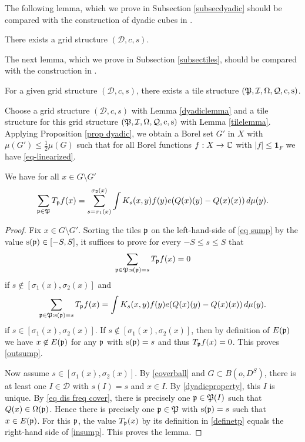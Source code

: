 The following lemma, which we prove in Subsection \ref{subsecdyadic}
should be compared with the construction of dyadic cubes in \cite[\S 3]{christ1990b}.

\begin{lemma}\label{dyadiclemma}
    There exists a grid structure $(\mathcal{D}, c,s)$.
\end{lemma}




The next lemma, which we prove in Subsection \ref{subsectiles}, should be compared
with the construction in \cite[Lemma 2.12]{zk-polynomial}.

\begin{lemma}\label{tilelemma}
    For a given grid structure $(\mathcal{D}, c,s)$, there exists a tile structure
    $(\mathfrak P,\mathcal{I},\Omega,\mathcal{Q},\mathrm{c},\mathrm{s})$.
\end{lemma}

Choose a grid structure $(\mathcal{D}, c,s)$ with Lemma \ref{dyadiclemma} and a tile structure for this
grid structure $(\mathfrak P,\mathcal{I},\Omega,\mathcal{Q},\mathrm{c},\mathrm{s})$ with Lemma \ref{tilelemma}.
Applying Proposition \ref{prop dyadic}, we obtain a Borel set $G'$ in $X$ with $\mu(G')\leq \frac 12 \mu(G)$ such that for all Borel functions $f:X\to \mathbb{C}$ with $|f|\le \mathbf{1}_F$
we have \eqref{eq-linearized}.

\begin{lemma} \label{lemmasump}
We have for all $x\in G\setminus G'$
\begin{equation}\label{eq sump}
    \sum_{\mathfrak p\in \mathfrak P}T_{\mathfrak p} f(x)= \sum_{s=\sigma_1(x)}^{\sigma_2(x)}
    \int   K_{s}(x,y) f(y) e({Q}(x)(y)-{Q}(x)(x))\, d\mu(y).
\end{equation}
\end{lemma}
\begin{proof}
Fix $x\in G\setminus G'$.
Sorting the tiles $\mathfrak p$ on the left-hand-side of \eqref{eq sump} by the value $\mathrm{s}(\mathfrak p)\in [-S,S]$,
it suffices to prove  for every $-S\le s\le S$ that
\begin{equation}\label{outsump}
    \sum_{\mathfrak p\in \mathfrak P: \mathrm{s}(\mathfrak p)=s}T_{\mathfrak p} f(x)=0
\end{equation}
    if $s\not\in [\sigma_1(x), \sigma_2(x)]$ and
\begin{equation}\label{insump}
    \sum_{\mathfrak p\in \mathfrak P: \mathrm{s}(\mathfrak p)=s}T_{\mathfrak p} f(x)=
    \int   K_{s}(x,y) f(y) e({Q}(x)(y) - {Q}(x)(x))\, d\mu(y).
\end{equation}
if $s\in [\sigma_1(x),\sigma_2(x)]$.
If $s\not\in [\sigma_1(x), \sigma_2(x)]$, then by definition of $E(\mathfrak p)$ we have
$x\not\in E(\mathfrak p)$ for any $\mathfrak p$ with $\mathrm{s}(\mathfrak p)=s$ and thus $T_{\mathfrak p} f(x)=0$. This proves
\eqref{outsump}.

Now assume $s\in [\sigma_1(x),\sigma_2(x)]$.
By \eqref{coverball} and $G\subset B(o,D^S)$, there is at least
one $I\in \mathcal{D}$ with $s(I)=s$ and $x\in I$.
By \eqref{dyadicproperty}, this $I$ is unique. By \eqref{eq dis freq cover}, there is precisely one $\mathfrak p\in \mathfrak P(I)$ such that
${Q}(x)\in \Omega(\mathfrak p)$. Hence there is precisely one  $\mathfrak p\in \mathfrak P$ with  $\mathrm{s}(\mathfrak p)=s$ such that
$x\in E(\mathfrak p)$. For this $\mathfrak p$, the value $T_{\mathfrak p}(x)$ by its definition in \eqref{definetp}
equals the right-hand side of \eqref{insump}. This proves the lemma.
\end{proof}


